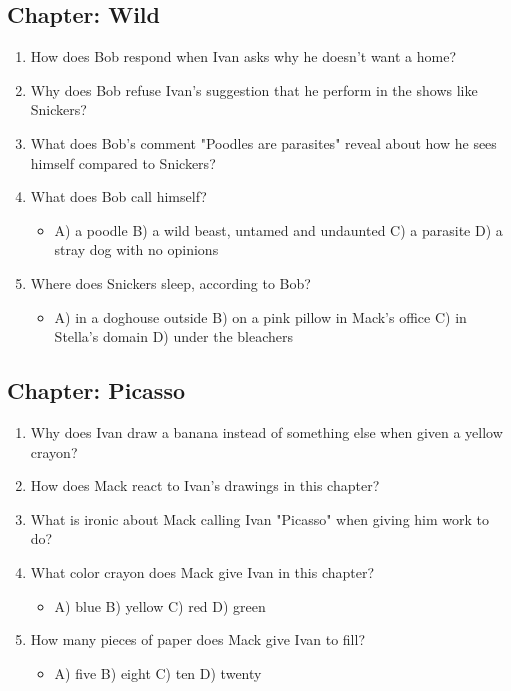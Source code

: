 \documentclass[11pt]{article}
\begin{document}
\subsection*{Chapter: Wild}
\begin{enumerate}
  \item How does Bob respond when Ivan asks why he doesn't want a home?
  \vspace{0.5in}
  \item Why does Bob refuse Ivan's suggestion that he perform in the shows like Snickers?
  \vspace{0.5in}
  \item What does Bob's comment "Poodles are parasites" reveal about how he sees himself compared to Snickers?
  \vspace{0.5in}
  \item What does Bob call himself?
  \begin{itemize}\setlength\itemsep{0pt}
    \item[] A) a poodle \quad B) a wild beast, untamed and undaunted \quad C) a parasite \quad D) a stray dog with no opinions
  \end{itemize}
  \item Where does Snickers sleep, according to Bob?
  \begin{itemize}\setlength\itemsep{0pt}
    \item[] A) in a doghouse outside \quad B) on a pink pillow in Mack's office \quad C) in Stella's domain \quad D) under the bleachers
  \end{itemize}
\end{enumerate}

\subsection*{Chapter: Picasso}
\begin{enumerate}
  \item Why does Ivan draw a banana instead of something else when given a yellow crayon?
  \vspace{0.5in}
  \item How does Mack react to Ivan's drawings in this chapter?
  \vspace{0.5in}
  \item What is ironic about Mack calling Ivan "Picasso" when giving him work to do?
  \vspace{0.5in}
  \item What color crayon does Mack give Ivan in this chapter?
  \begin{itemize}\setlength\itemsep{0pt}
    \item[] A) blue \quad B) yellow \quad C) red \quad D) green
  \end{itemize}
  \item How many pieces of paper does Mack give Ivan to fill?
  \begin{itemize}\setlength\itemsep{0pt}
    \item[] A) five \quad B) eight \quad C) ten \quad D) twenty
  \end{itemize}
\end{enumerate}
\end{document}
